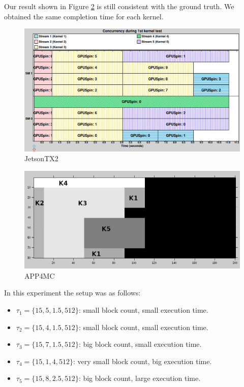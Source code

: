 \documentclass[
  12pt,
  a4paperpaper,
]{report}
\providecommand{\tightlist}{%
  \setlength{\itemsep}{0pt}\setlength{\parskip}{0pt}}
\begin{document}
Our result shown in Figure \ref{img:octave-ex06} is still consistent
with the ground truth. We obtained the same completion time for each
kernel.

\begin{figure}
\centering
\includegraphics[width=1\textwidth,height=\textheight]{source/figures/nvidia/ex06.png}
\caption{JetsonTX2 \label{img:nvidia-ex06}}
\end{figure}

\begin{figure}
\centering
\includegraphics[width=1\textwidth,height=\textheight]{source/figures/octave/ex06.png}
\caption{APP4MC \label{img:octave-ex06}}
\end{figure}

In this experiment the setup was as follows:

\begin{itemize}
\tightlist
\item
  \(\tau_1 = \{15,5,1.5,512\}\): small block count, small execution
  time.
\item
  \(\tau_2 = \{15,4,1.5,512\}\): small block count, small execution
  time.
\item
  \(\tau_3 = \{15,7,1.5,512\}\): big block count, small execution time.
\item
  \(\tau_4 =\{ 15, 1,4,512\}\): very small block count, big execution
  time.
\item
  \(\tau_5 = \{15,8,2.5,512\}\): big block count, large execution time.
\end{itemize}
\end{document}
